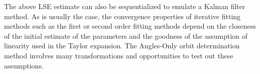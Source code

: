 The above LSE estimate can also be sequentialized to emulate a Kalman filter method. As is usually the case, the convergence properties of iterative fitting methods such as the
first or second order fitting methods depend on the closeness of the initial estimate of the parameters and the goodness of the assumption of linearity used in the Taylor expansion. The Angles-Only
orbit determination method involves many transformations and opportunities to test out these assumptions.